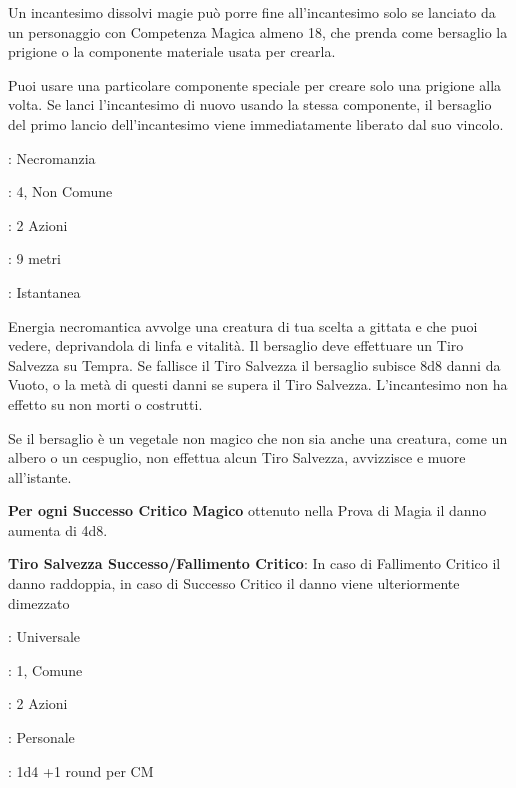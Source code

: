 \begin{multicols}{2}
Un incantesimo dissolvi magie può porre fine all'incantesimo solo se lanciato da un personaggio con Competenza Magica almeno 18, che prenda come bersaglio la prigione o la componente materiale usata per crearla.

Puoi usare una particolare componente speciale per creare solo una prigione alla volta. Se lanci l'incantesimo di nuovo usando la stessa componente, il bersaglio del primo lancio dell'incantesimo viene immediatamente liberato dal suo vincolo.

\noindent\colorbox{OBSSgold!10}{
\begin{minipage}{0.95\linewidth}
\begin{description}[noitemsep, topsep=0pt, parsep=0pt, partopsep=0pt, leftmargin=0cm, labelwidth=1.3cm]
	\item[\textbf{Lista}]: Necromanzia
	\item[\textbf{Livello}]: 4, Non Comune
	\item[\textbf{Lancio}]: 2 Azioni
	\item[\textbf{Gittata}]: 9 metri
	\item[\textbf{Durata}]: Istantanea
\end{description}
\end{minipage}}\smallskip
Energia necromantica avvolge una creatura di tua scelta a gittata e che puoi vedere, deprivandola di linfa e vitalità. Il bersaglio deve effettuare un Tiro Salvezza su Tempra. Se fallisce il Tiro Salvezza il bersaglio subisce 8d8 danni da Vuoto, o la metà di questi danni se supera il Tiro Salvezza. L'incantesimo non ha effetto su non morti o costrutti.

Se il bersaglio è un vegetale non magico che non sia anche una creatura, come un albero o un cespuglio, non effettua alcun Tiro Salvezza, avvizzisce e muore all'istante.

\textbf{Per ogni Successo Critico Magico} ottenuto nella Prova di Magia il danno aumenta di 4d8.

\textbf{Tiro Salvezza Successo/Fallimento Critico}: In caso di Fallimento Critico il danno raddoppia, in caso di Successo Critico il danno viene ulteriormente dimezzato

\begin{description}[noitemsep, topsep=0pt, parsep=0pt, partopsep=0pt, leftmargin=0cm, labelwidth=1.3cm]
	\item[\textbf{Lista}]: Universale
	\item[\textbf{Livello}]: 1, Comune
	\item[\textbf{Lancio}]: 2 Azioni
	\item[\textbf{Gittata}]: Personale
	\item[\textbf{Durata}]: 1d4 +1 round per CM
\end{description}


\end{multicols}
